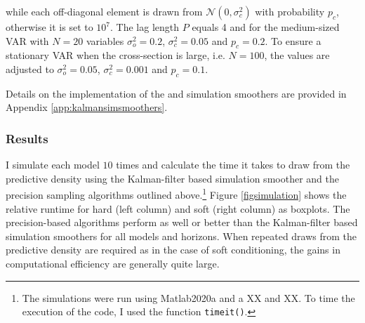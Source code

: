 \documentclass[notitlepage,a4paper,12pt]{article}
\begin{document}
\noindent while each off-diagonal element is drawn from $\mathcal{N}(0, \sigma^2_c)$ with probability $p_c$, otherwise it is set to $10^7$. The lag length $P$ equals 4 and for the medium-sized VAR with $N=20$ variables $\sigma^2_o = 0.2 $, $\sigma^2_c = 0.05$ and $p_c = 0.2$. To ensure a stationary VAR when the cross-section is large, i.e. $N=100$, the values are adjusted to $\sigma^2_o = 0.05 $, $\sigma^2_c = 0.001$ and $p_c = 0.1$.

Details on the implementation of the \citet{carterkohn1994_biomtr} and \citet{durbinkoopman2002_biomtr} simulation smoothers are provided in Appendix \ref{app:kalmansimsmoothers}.\\

\subsubsection{Results}

I simulate each model $10$ times and calculate the time it takes to draw from the predictive density using the Kalman-filter based simulation smoother and the precision sampling algorithms outlined above.\footnote{The simulations were run using Matlab2020a and a XX and XX. To time the execution of the code, I used the function \texttt{timeit()}.} Figure \ref{figsimulation} shows the relative runtime for hard (left column) and soft (right column) as boxplots. The precision-based algorithms perform as well or better than the Kalman-filter based simulation smoothers for all models and horizons. When repeated draws from the predictive density are required as in the case of soft conditioning, the gains in computational efficiency are generally quite large. 
\end{document}
